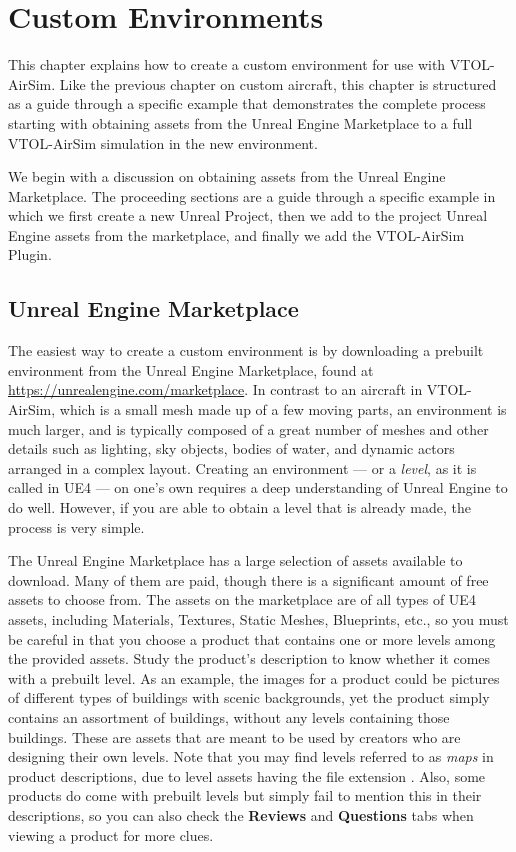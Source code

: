 \chapter{Custom Environments}\label{chp:custom_envs}
This chapter explains how to create a custom environment for use with VTOL-AirSim. Like the previous chapter on custom aircraft, this chapter is structured as a guide through a specific example that demonstrates the complete process starting with obtaining assets from the Unreal Engine Marketplace to a full VTOL-AirSim simulation in the new environment.

We begin with a discussion on obtaining assets from the Unreal Engine Marketplace. The proceeding sections are a guide through a specific example in which we first create a new Unreal Project, then we add to the project Unreal Engine assets from the marketplace, and finally we add the VTOL-AirSim Plugin.

\section{Unreal Engine Marketplace}
The easiest way to create a custom environment is by downloading a prebuilt environment from the Unreal Engine Marketplace, found at \url{https://unrealengine.com/marketplace}. In contrast to an aircraft in VTOL-AirSim, which is a small mesh made up of a few moving parts, an environment is much larger, and is typically composed of a great number of meshes and other details such as lighting, sky objects, bodies of water, and dynamic actors arranged in a complex layout. Creating an environment --- or a \textit{level}, as it is called in UE4 --- on one's own requires a deep understanding of Unreal Engine to do well. However, if you are able to obtain a level that is already made, the process is very simple.

The Unreal Engine Marketplace has a large selection of assets available to download. Many of them are paid, though there is a significant amount of free assets to choose from. The assets on the marketplace are of all types of UE4 assets, including Materials, Textures, Static Meshes, Blueprints, etc., so you must be careful in that you choose a product that contains one or more levels among the provided assets. Study the product's description to know whether it comes with a prebuilt level. As an example, the images for a product could be pictures of different types of buildings with scenic backgrounds, yet the product simply contains an assortment of buildings, without any levels containing those buildings. These are assets that are meant to be used by creators who are designing their own levels. Note that you may find levels referred to as \textit{maps} in product descriptions, due to level assets having the file extension . Also, some products do come with prebuilt levels but simply fail to mention this in their descriptions, so you can also check the \textbf{Reviews} and \textbf{Questions} tabs when viewing a product for more clues.

